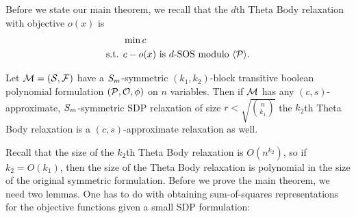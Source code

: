 Before we state our main theorem, we recall that the $d$th Theta Body relaxation with objective $o(x)$ is
\begin{align*}
&\min c \\
\text{s.t. } &c - o(x) \text{ is $d$-SOS modulo $\langle \mathcal P \rangle$.}
\end{align*} 
\begin{theorem}\label{thm:symmetric-main}
Let $\mathcal M = (\mathcal S, \mathcal F)$ have a $S_{m}$-symmetric $(k_1,k_2)$-block transitive boolean polynomial formulation $(\mathcal P, \mathcal O, \phi)$ on $n$ variables. Then if $\mathcal M$ has any $(c,s)$-approximate, $S_{m}$-symmetric SDP relaxation of size $r < \sqrt{\binom{n}{k_1}}$ the $k_2$th Theta Body relaxation is a $(c,s)$-approximate relaxation as well.
\end{theorem}
Recall that the size of the $k_2$th Theta Body relaxation is $O(n^{k_2})$, so if $k_2 = O(k_1)$, then the size of the Theta Body relaxation is polynomial in the size of the original symmetric formulation. Before we prove the main theorem, we need two lemmas. One has to do with obtaining sum-of-squares representations for the objective functions given a small SDP formulation:

